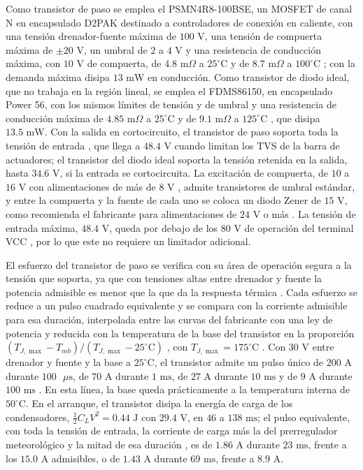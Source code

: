 \documentclass[../../General.tex]{subfiles}
\begin{document}
Como transistor de paso se emplea el PSMN4R8-100BSE, un MOSFET de canal N en encapsulado D2PAK destinado a controladores de conexión en caliente, con una tensión drenador-fuente máxima de $100\text{ V}$, una tensión de compuerta máxima de $\pm 20\text{ V}$, un umbral de $2$ a $4\text{ V}$ y una resistencia de conducción máxima, con $10\text{ V}$ de compuerta, de $4.8\text{ m}\Omega$ a $25^\circ\text{C}$ y de $8.7\text{ m}\Omega$ a $100^\circ\text{C}$ \citep{nexperia_psmn4r8}; con la demanda máxima disipa $13\text{ mW}$ en conducción. Como transistor de diodo ideal, que no trabaja en la región lineal, se emplea el FDMS86150, en encapsulado Power 56, con los mismos límites de tensión y de umbral y una resistencia de conducción máxima de $4.85\text{ m}\Omega$ a $25^\circ\text{C}$ y de $9.1\text{ m}\Omega$ a $125^\circ\text{C}$ \citep{onsemi_fdms86150}, que disipa $13.5\text{ mW}$. Con la salida en cortocircuito, el transistor de paso soporta toda la tensión de entrada \citep{adi_ltc4364}, que llega a $48.4\text{ V}$ cuando limitan los TVS de la barra de actuadores; el transistor del diodo ideal soporta la tensión retenida en la salida, hasta $34.6\text{ V}$, si la entrada se cortocircuita. La excitación de compuerta, de $10$ a $16\text{ V}$ con alimentaciones de más de $8\text{ V}$ \citep{adi_ltc4364}, admite transistores de umbral estándar, y entre la compuerta y la fuente de cada uno se coloca un diodo Zener de $15\text{ V}$, como recomienda el fabricante para alimentaciones de $24\text{ V}$ o más \citep{adi_ltc4364}. La tensión de entrada máxima, $48.4\text{ V}$, queda por debajo de los $80\text{ V}$ de operación del terminal VCC \citep{adi_ltc4364}, por lo que este no requiere un limitador adicional.

El esfuerzo del transistor de paso se verifica con su área de operación segura a la tensión que soporta, ya que con tensiones altas entre drenador y fuente la potencia admisible es menor que la que da la respuesta térmica \citep{ti_slva673a}. Cada esfuerzo se reduce a un pulso cuadrado equivalente y se compara con la corriente admisible para esa duración, interpolada entre las curvas del fabricante con una ley de potencia y reducida con la temperatura de la base del transistor en la proporción $(T_{J,\max} - T_{mb})/(T_{J,\max} - 25^\circ\text{C})$ \citep{ti_slva673a}, con $T_{J,\max} = 175^\circ\text{C}$ \citep{nexperia_psmn4r8}. Con $30\text{ V}$ entre drenador y fuente y la base a $25^\circ\text{C}$, el transistor admite un pulso único de $200\text{ A}$ durante $100\text{ }\mu\text{s}$, de $70\text{ A}$ durante $1\text{ ms}$, de $27\text{ A}$ durante $10\text{ ms}$ y de $9\text{ A}$ durante $100\text{ ms}$ \citep{nexperia_psmn4r8}. En esta línea, la base queda prácticamente a la temperatura interna de $50^\circ\text{C}$. En el arranque, el transistor disipa la energía de carga de los condensadores, $\tfrac{1}{2} C_L V^2 = 0.44\text{ J}$ con $29.4\text{ V}$, en $46$ a $138\text{ ms}$; el pulso equivalente, con toda la tensión de entrada, la corriente de carga más la del prerregulador meteorológico y la mitad de esa duración \citep{ti_slva673a}, es de $1.86\text{ A}$ durante $23\text{ ms}$, frente a los $15.0\text{ A}$ admisibles, o de $1.43\text{ A}$ durante $69\text{ ms}$, frente a $8.9\text{ A}$.
\end{document}

